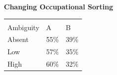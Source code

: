 \begin{frame}
\textbf{Changing Occupational Sorting}\vspace{0.3cm}


\begin{center}
\begin{tabular}{C{1.8cm} C{2cm} C{2cm} }\toprule
                        &  \\[-2ex]
     Ambiguity          & A & B  \\\midrule
    Absent & 55\% & 39\%  \\
    Low    & 57\% & 35\%   \\
    High   & 60\% & 32\%   \\\bottomrule
\end{tabular}
\end{center}
\end{frame}
